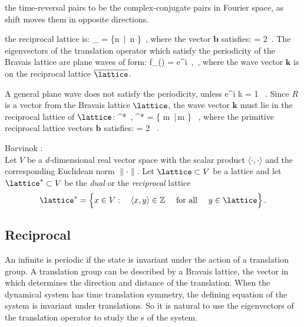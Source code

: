 the time-reversal pairs
to be the complex-conjugate pairs in Fourier space, as \Cn{\infty} shift
moves them in opposite directions.

the reciprocal lattice is:
\beq
\overline{\lattice}_{} = \{n \,|\, n \in {}\}
\,,
where the vector $\mathbf{b}$ satisfies:
\beq
{} \cdot {} = 2 \pi
\,.
The eigenvectors of the translation operator which satisfy the
periodicity of the Bravais lattice %
are plane waves of form:
\beq
f_() = e^{i  \cdot {}}
  \,, \quad
{} \in \overline{\lattice}
\,,
where the wave vector $\mathbf{k}$ is on the reciprocal lattice
$\overline{\lattice}$.

 A general plane wave does not
satisfy the periodicity, unless
\beq
e^{i {k} } = 1
\, .
Since ${R}$ is a vector from the Bravais lattice $\lattice$, the wave
vector $\mathbf{k}$ must lie in the reciprocal lattice of $\lattice$:
\beq
{} \in \lattice^*
\,,\quad
\lattice^* =
\left\{ m \,|\,m \in {}\right\} \, ,
where the primitive reciprocal lattice vectors $\mathbf{b}$ satisfies:
 \beq
{} \cdot {} = 2 \pi
\, .


Barvinok :
\\
Let $V$ be a $d$-dimensional real vector space with the scalar product
$\langle \cdot, \cdot \rangle$
and the corresponding Euclidean norm $\| \cdot\|$. Let $\lattice \subset V$ be a lattice
and let  $\lattice^{\ast} \subset V$ be the {\it dual} or the {\it reciprocal} lattice
\[
\lattice^{\ast}=\Bigl\{x \in V: \quad \langle x, y \rangle \in {\Bbb Z}
\quad
\mbox{ for all } \quad y \in \lattice \Bigr\}
\,.
\]

\subsection{Reciprocal {\lattstate}}

An infinite {\lattstate} is periodic if the state is invariant under the action of a translation group.
A translation group can be described by a Bravais lattice, the vector in
which determines the direction and distance of the translation. When the dynamical system
has time translation symmetry, the defining equation of the system is invariant under translations.
So it is natural to use the eigenvectors of the translation operator to study the {\lattstate}s of the
system.

